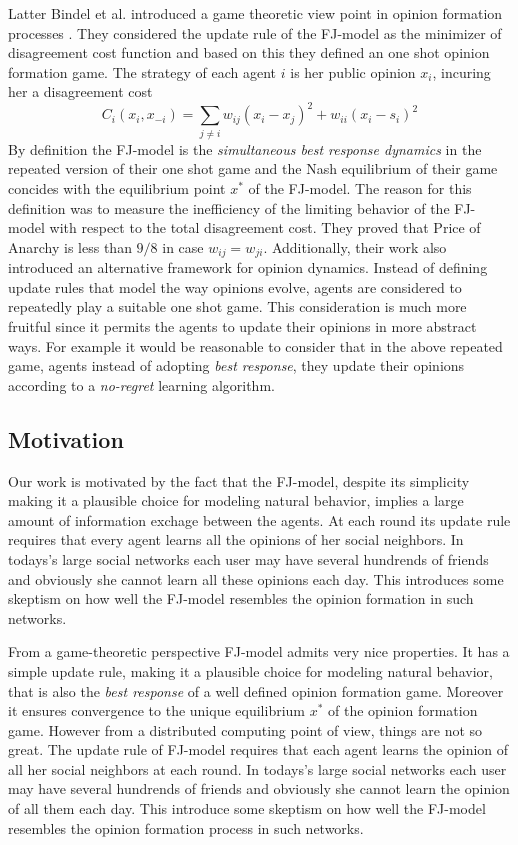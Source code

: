 Latter Bindel et al. introduced a game theoretic
view point in opinion formation processes \cite{BKO11}.
They considered the update rule of the FJ-model
as the minimizer of disagreement cost function
and based on this they defined an one shot
opinion formation game. The strategy of each agent $i$ is
her public opinion $x_i$, incuring her a
disagreement cost \[C_i(x_i,x_{-i})=\sum_{j \neq i}w_{ij}
(x_i-x_j)^2 + w_{ii}(x_i-s_i)^2\]
By definition the FJ-model is the
\emph{simultaneous best response dynamics} in the repeated
version of their one shot game and the Nash equilibrium
of their game concides with the equilibrium point
$x^*$ of the FJ-model. The reason for this definition
was to measure the inefficiency of the limiting behavior
of the FJ-model with respect to the total disagreement cost.
They proved that Price of Anarchy is less than $9/8$
in case $w_{ij}=w_{ji}$. Additionally, their work also introduced
an alternative framework for opinion dynamics.
Instead of defining update rules that model the
way opinions evolve, agents are considered to repeatedly
play a suitable one shot game. This consideration is
much more fruitful since it permits the agents to
update their opinions in more abstract ways.
For example it would be reasonable to consider
that in the above repeated game, agents instead of
adopting \emph{best response}, they update their opinions according
to a \emph{no-regret} learning algorithm.

\subsection{Motivation}
Our work is motivated by the fact that the FJ-model,
despite its simplicity making it a plausible choice
for modeling natural behavior, implies a large amount of
information exchage between the agents. At each round
its update rule requires that every agent learns all the
opinions of her social neighbors.
In todays's large social networks each user
may have several hundrends of friends and obviously
she cannot learn all these opinions each day.
This introduces some skeptism on how well the
FJ-model resembles the opinion formation in such
networks.

From a game-theoretic perspective FJ-model admits
very nice properties. It has a simple update rule, making it
a plausible choice for modeling natural behavior, that
is also the \emph{best response} of a well
defined opinion formation game. Moreover it ensures
convergence to the unique equilibrium $x^*$ of the opinion
formation game. However from a
distributed computing point of view, things are not
so great. The update rule of FJ-model requires that each agent learns
the opinion of all her social neighbors at each
round. In todays's large social networks each user
may have several hundrends of friends and obviously
she cannot learn the opinion of all them each day.
This introduce some skeptism on how well the
FJ-model resembles the opinion formation process in such
networks.

